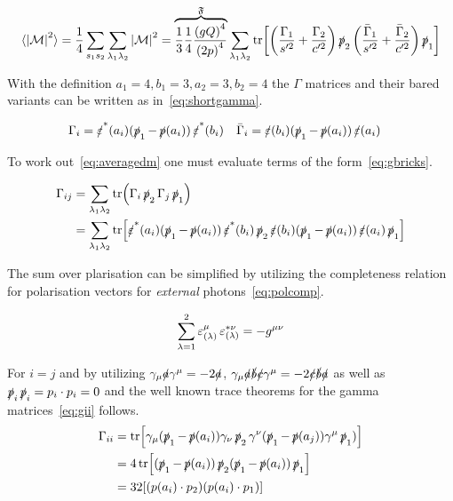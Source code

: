 \begin{equation}
  \label{eq:averagedm}
  \langle\abs{\mathcal{M}}^2\rangle = \frac{1}{4}\sum_{s_1 s_2}\sum_{\lambda_1
    \lambda_2} \abs{\mathcal{M}}^2=\overbrace{\frac{1}{3}\frac{1}{4}\frac{\qty(gQ)^4}{\qty(2p)^4}}^\mathfrak{F}\sum_{\lambda_1
    \lambda_2}\tr[\qty(\frac{\Gamma_1}{s'^2}+\frac{\Gamma_2}{c'^2})
  \ps_2\qty(\frac{\bar{\Gamma}_1}{s'^2}+\frac{\bar{\Gamma}_2}{c'^2})\ps_1]
\end{equation}

With the definition \(a_1=4,b_1=3,a_2=3,b_2=4\) the \(\Gamma\)
matrices and their bared variants can be written as in~\eqref{eq:shortgamma}.

\begin{align}
  \label{eq:shortgamma}
  \Gamma_i &= \pses(a_i)(\ps_1 - \ps(a_i))\pses(b_i) & \bar{\Gamma}_i &= \pes(b_i)(\ps_1 - \ps(a_i))\pes(a_i)
\end{align}

To work out~\eqref{eq:averagedm} one must evaluate terms of the
form~\eqref{eq:gbricks}.

\begin{equation}
  \label{eq:gbricks}
  \begin{split}
    \Gamma_{ij} &= \sum_{\lambda_1\lambda_2}
    \tr(\Gamma_i\ps_2\Gamma_j\ps_1)\\
    &= \sum_{\lambda_1\lambda_2}
    \tr[\pses(a_i)(\ps_1-\ps(a_i))\pses(b_i)\ps_2\pes(b_i)(\ps_1 -
    \ps(a_i))\pes(a_i)\ps_1]
  \end{split}
\end{equation}

The sum over plarisation can be simplified by utilizing the
completeness relation for polarisation vectors for \emph{external}
photons~\eqref{eq:polcomp}.

\begin{equation}
  \label{eq:polcomp}
  \sum_{\lambda=1}^{2}\pe_{(\lambda)}^\mu\pe_{(\lambda)}^{*\nu} = -g^{\mu\nu}
\end{equation}

For \(i=j\) and by utilizing \(\gamma_\mu\sl{a}\gamma^\mu=-2\sl{a}\),
 \(\gamma_\mu\sl{a}\sl{b}\sl{c}\gamma^\mu=-2\sl{c}\sl{b}\sl{a}\) as
well as \(\ps_i\ps_i=p_i\cdot p_i = 0\) and the well known trace
theorems for the gamma matrices~\eqref{eq:gii} follows.
\begin{equation}
  \label{eq:gii}
  \begin{split}
\Gamma_{ii} &=
\tr[\gamma_\mu(\ps_1-\ps(a_i))\gamma_\nu\ps_2\gamma^\nu(\ps_1-\ps(a_j))\gamma^\mu\ps_1)]
\\
&= 4\tr[(\ps_1-\ps(a_i))\ps_2(\ps_1-\ps(a_i))\ps_1]\\
&= 32\qty[(p(a_i)\cdot p_2)(p(a_i)\cdot p_1)]
\end{split}
\end{equation}

